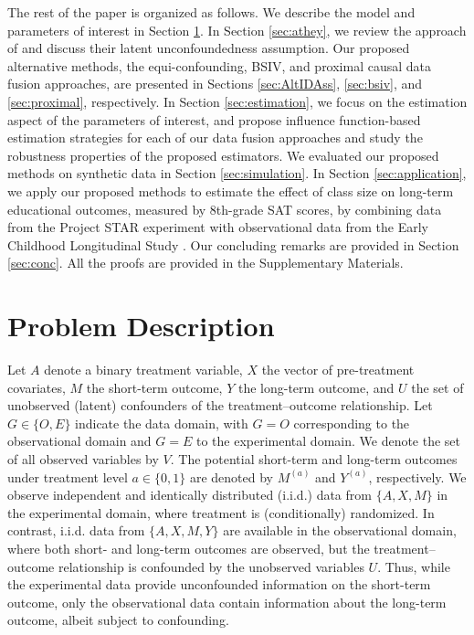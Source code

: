 \documentclass[10pt]{article}
\begin{document}
The rest of the paper is organized as follows. We describe the model and parameters of interest in Section \ref{sec:desc}. In Section \ref{sec:athey}, we review the approach of \cite{athey2020combining} and discuss their latent unconfoundedness assumption. Our proposed alternative methods, the equi-confounding, BSIV, and proximal causal data fusion approaches, are presented in Sections \ref{sec:AltIDAss}, \ref{sec:bsiv}, and \ref{sec:proximal}, respectively. In Section \ref{sec:estimation}, we focus on the estimation aspect of the parameters of interest, and propose influence function-based estimation strategies for each of our data fusion approaches and study the robustness properties of the proposed estimators.
We evaluated our proposed methods on synthetic data in Section \ref{sec:simulation}. In Section \ref{sec:application}, we apply our proposed methods to estimate the effect of class size on long-term educational outcomes, measured by 8th-grade SAT scores, by combining data from the Project STAR experiment with observational data from the Early Childhood Longitudinal Study \citep{tourangeau2009eclsk}. Our concluding remarks are provided in Section \ref{sec:conc}. All the proofs are provided in the Supplementary Materials.


\section{Problem Description}
\label{sec:desc}

Let \( A \) denote a binary treatment variable, \( X \) the vector of pre-treatment covariates, \( M \) the short-term outcome, \( Y \) the long-term outcome, and \( U \) the set of unobserved (latent) confounders of the treatment--outcome relationship. Let \( G \in \{O, E\} \) indicate the data domain, with \( G = O \) corresponding to the observational domain and \( G = E \) to the experimental domain. We denote the set of all observed variables by \( V \). The potential short-term and long-term outcomes under treatment level \( a \in \{0,1\} \) are denoted by \( M^{(a)} \) and \( Y^{(a)} \), respectively. We observe independent and identically distributed (i.i.d.) data from \( \{A, X, M\} \) in the experimental domain, where treatment is (conditionally) randomized. In contrast, i.i.d. data from \( \{A, X, M, Y\} \) are available in the observational domain, where both short- and long-term outcomes are observed, but the treatment--outcome relationship is confounded by the unobserved variables \( U \). Thus, while the experimental data provide unconfounded information on the short-term outcome, only the observational data contain information about the long-term outcome, albeit subject to confounding.
\end{document}
